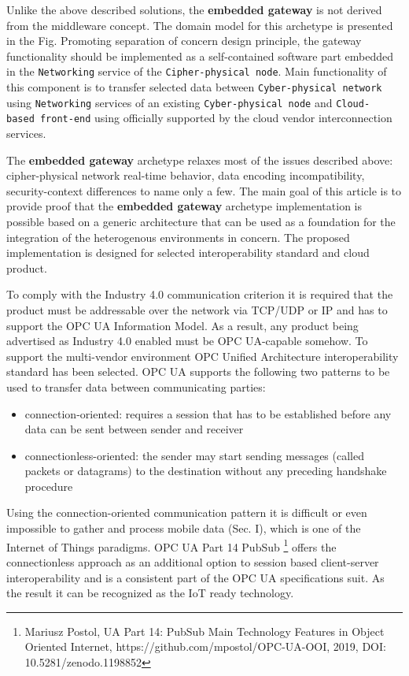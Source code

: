\documentclass{jacsart}
\providecommand{\tightlist} { \setlength{\itemsep}{0pt}\setlength{\parskip}{0pt}}
\begin{document}
Unlike the above described solutions, the \textbf{embedded gateway} is
not derived from the middleware concept. The domain model for this
archetype is presented in the Fig. Promoting separation of concern
design principle, the gateway functionality should be implemented as a
self-contained software part embedded in the \texttt{Networking} service
of the \texttt{Cipher-physical\ node}. Main functionality of this
component is to transfer selected data between
\texttt{Cyber-physical\ network} using \texttt{Networking} services of
an existing \texttt{Cyber-physical\ node} and
\texttt{Cloud-based\ front-end} using officially supported by the cloud
vendor interconnection services.

The \textbf{embedded gateway} archetype relaxes most of the issues
described above: cipher-physical network real-time behavior, data
encoding incompatibility, security-context differences to name only a
few. The main goal of this article is to provide proof that the
\textbf{embedded gateway} archetype implementation is possible based on
a generic architecture that can be used as a foundation for the
integration of the heterogenous environments in concern. The proposed
implementation is designed for selected interoperability standard and
cloud product.

To comply with the Industry 4.0 communication criterion it is required that the product must be addressable over the network via TCP/UDP or IP and has to support the OPC UA Information Model. As a result, any product being advertised as Industry 4.0 enabled must be OPC UA-capable somehow. To support the multi-vendor environment OPC Unified Architecture interoperability standard has been selected. OPC UA supports the following two patterns to be used to transfer data between communicating parties:

\begin{itemize}
\tightlist
\item
  connection-oriented: requires a session that has to be established before any data can be sent between sender and receiver
\item
  connectionless-oriented: the sender may start sending messages (called packets or datagrams) to the destination without any preceding handshake procedure
\end{itemize}

Using the connection-oriented communication pattern it is difficult or
even impossible to gather and process mobile data (Sec. I), which is one
of the Internet of Things paradigms. OPC UA Part 14 PubSub  \footnote{Mariusz Postol, UA Part 14: PubSub Main Technology Features in Object Oriented Internet, https://github.com/mpostol/OPC-UA-OOI, 2019, DOI: 10.5281/zenodo.1198852} offers the
connectionless approach as an additional option to session based
client-server interoperability and is a consistent part of the OPC UA
specifications suit. As the result it can be recognized as the IoT ready
technology.
\end{document}
